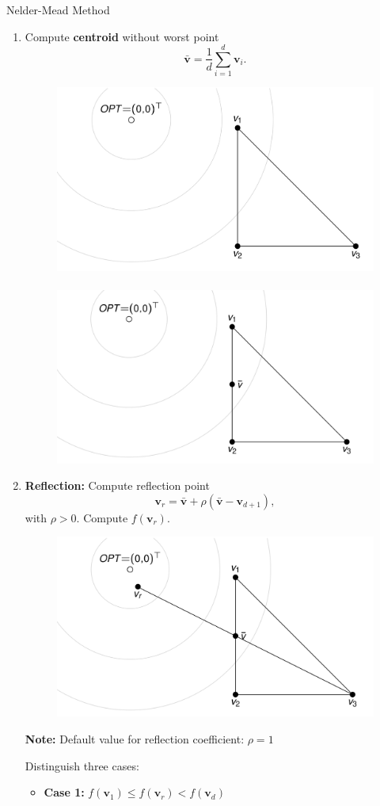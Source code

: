 \documentclass[11pt,compress,t,notes=noshow, xcolor=table]{beamer}
\begin{document}
\begin{vbframe}{Nelder-Mead Method}
\begin{enumerate}
\item Compute \textbf{centroid} without worst point
$$
\bar{\mathbf{v}} = \frac{1}{d} \sum_{i = 1}^d \mathbf{v}_i.
$$

\begin{figure}
\includegraphics[width = 0.43\linewidth]{figure_man/Nelder02.png} ~~~ \includegraphics[width = 0.43\linewidth]{figure_man/Nelder03.png}
\end{figure}

\framebreak

\item \textbf{Reflection:} Compute reflection point
$$
\mathbf{v}_r = \bar{\mathbf{v}} + \rho (\bar{\mathbf{v}} - \mathbf{v}_{d + 1}),
$$
with $\rho > 0$.
Compute $f(\mathbf{v}_r)$.

\vspace{\baselineskip}

\begin{figure}
    \includegraphics[width = 0.43\linewidth]{figure_man/Nelder04.png} 
\end{figure}

\vspace{\baselineskip}

\textbf{Note:} Default value for reflection coefficient: $\rho = 1$

\framebreak

\small
Distinguish three cases:

\begin{itemize}
    \small
    \item \textbf{Case 1:} $f(\mathbf{v}_1) \leq f(\mathbf{v}_r) < f(\mathbf{v}_d)$


\end{itemize}
\end{enumerate}
\end{vbframe}
\end{document}
